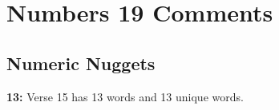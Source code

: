 \section{Numbers 19 Comments}

\subsection{Numeric Nuggets}
\textbf{13: } Verse 15 has 13 words and 13 unique words.